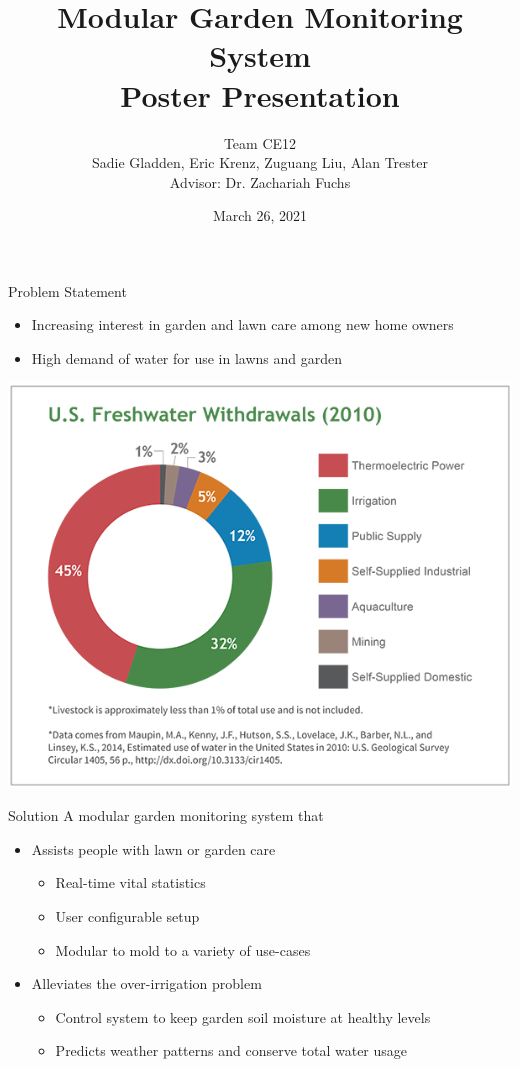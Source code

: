 \documentclass{beamer}
\title[Poster Presentation]{Modular Garden Monitoring System \\ Poster Presentation}
\author[Team CE12]{Team CE12 \\
Sadie Gladden, Eric Krenz, Zuguang Liu, Alan Trester \\
Advisor: Dr. Zachariah Fuchs}
\date{March 26, 2021}
\begin{document}
\begin{frame}[plain] %
    \maketitle
\end{frame}

\begin{frame}{Problem Statement}
    \begin{itemize}
        \item Increasing interest in garden and lawn care among new home owners
        \item High demand of water for use in lawns and garden
    \end{itemize}
    \begin{center}
        \includegraphics[width=0.5\linewidth]{PNGs/pie.PNG}
    \end{center}
\end{frame}

\begin{frame}{Solution}
    A modular garden monitoring system that
    \begin{itemize}
        \item Assists people with lawn or garden care
              \begin{itemize}
                  \item Real-time vital statistics
                  \item User configurable setup
                  \item Modular to mold to a variety of use-cases
              \end{itemize}
        \item Alleviates the over-irrigation problem
              \begin{itemize}
                  \item Control system to keep garden soil moisture at healthy levels
                  \item Predicts weather patterns and conserve total water usage
              \end{itemize}
    \end{itemize}
\end{frame}
\end{document}
